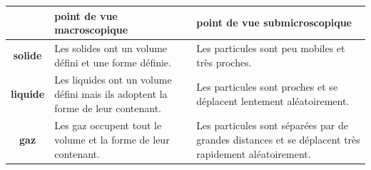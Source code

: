 \documentclass[
  11pt,
  french,
  a4paper,
  openany]{book}
\begin{document}
\begin{longtable}[]{@{}cll@{}}
\toprule
\begin{minipage}[b]{0.05\columnwidth}\centering
\strut
\end{minipage} & \begin{minipage}[b]{0.38\columnwidth}\raggedright
\textbf{point de vue macroscopique}\strut
\end{minipage} & \begin{minipage}[b]{0.48\columnwidth}\raggedright
\textbf{point de vue submicroscopique}\strut
\end{minipage}\tabularnewline
\midrule
\endhead
\begin{minipage}[t]{0.05\columnwidth}\centering
\textbf{solide}\strut
\end{minipage} & \begin{minipage}[t]{0.38\columnwidth}\raggedright
Les solides ont un volume défini et une forme définie.\strut
\end{minipage} & \begin{minipage}[t]{0.48\columnwidth}\raggedright
Les particules sont peu mobiles et très proches.\strut
\end{minipage}\tabularnewline
\begin{minipage}[t]{0.05\columnwidth}\centering
\textbf{liquide}\strut
\end{minipage} & \begin{minipage}[t]{0.38\columnwidth}\raggedright
Les liquides ont un volume défini mais ils adoptent la forme de leur contenant.\strut
\end{minipage} & \begin{minipage}[t]{0.48\columnwidth}\raggedright
Les particules sont proches et se déplacent lentement aléatoirement.\strut
\end{minipage}\tabularnewline
\begin{minipage}[t]{0.05\columnwidth}\centering
\textbf{gaz}\strut
\end{minipage} & \begin{minipage}[t]{0.38\columnwidth}\raggedright
Les gaz occupent tout le volume et la forme de leur contenant.\strut
\end{minipage} & \begin{minipage}[t]{0.48\columnwidth}\raggedright
Les particules sont séparées par de grandes distances et se déplacent très rapidement aléatoirement.\strut
\end{minipage}\tabularnewline
\bottomrule
\end{longtable}
\end{document}
